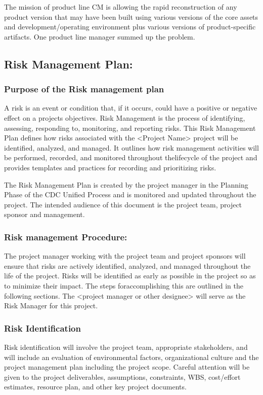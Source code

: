 The mission of product line CM is allowing the rapid reconstruction of any product version that may have been built using various versions of the core assets and development/operating environment plus various versions of product-specific artifacts. One product line manager summed up the problem.

\subsection*{Risk Management Plan:}
\subsubsection*{Purpose of the Risk management plan}

A risk is an event or condition that, if it occurs, could have a positive or negative effect on a
projects objectives. Risk Management is the process of identifying, assessing, responding to,
monitoring, and reporting risks. This Risk Management Plan defines how risks associated
with the <Project Name> project will be identified, analyzed, and managed. It outlines how
risk management activities will be performed, recorded, and monitored throughout thelifecycle of the project and provides templates and practices for recording and prioritizing risks.

The Risk Management Plan is created by the project manager in the Planning Phase of the CDC Unified Process and is monitored and updated throughout the project. The intended audience of this document is the project team, project sponsor and management.
\subsubsection*{Risk management Procedure:}
The project manager working with the project team and project sponsors will ensure that risks are actively identified, analyzed, and managed throughout the life of the project. Risks will be identified as early as possible in the project so as to minimize their impact. The steps foraccomplishing this are outlined in the following sections. The <project manager or other designee> will serve as the Risk Manager for this project.
\subsubsection*{Risk Identification}
Risk identification will involve the project team, appropriate stakeholders, and will include an
evaluation of environmental factors, organizational culture and the project management plan
including the project scope. Careful attention will be given to the project deliverables,
assumptions, constraints, WBS, cost/effort estimates, resource plan, and other key project documents.

